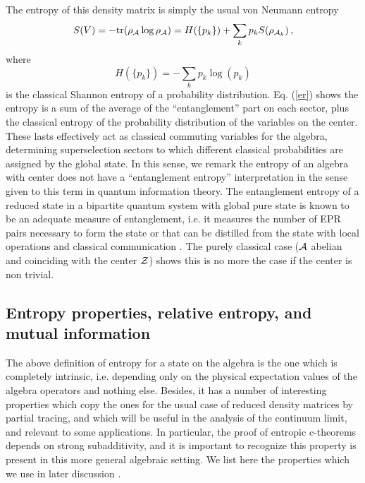 \documentclass[12pt,a4paper]{article}
\begin{document}
The entropy of this density matrix is simply the usual von Neumann entropy
\begin{equation}
S(V)=-\textrm{tr}(\rho_{\cal A}\log \rho_{\cal A})=H(\{p_k\})+\sum_k p_k S(\rho_{{\cal A}_k})\,,\label{er}
\end{equation}
where 
\begin{equation}
H(\{p_k\})=-\sum_k p_k \log(p_k)
\end{equation}
is the classical Shannon entropy of a probability distribution. 
Eq. (\ref{er}) shows the entropy is a sum of the average of the ``entanglement'' part on each sector, plus the classical entropy 
of the probability distribution of the variables on the center. These lasts effectively act as classical commuting variables for the 
algebra, determining superselection sectors to which different classical probabilities are assigned by the global state.  In this 
sense, we remark the entropy of an algebra with center does not have a ``entanglement entropy'' interpretation in the sense given 
to this term in quantum information theory. The entanglement entropy of a reduced state in a bipartite quantum system with global 
pure state is known to be an adequate measure of entanglement, i.e. it measures the number of EPR pairs necessary to form the state 
or that can be distilled from the state with local operations and classical communication \cite{nielsen}. The purely classical case (${\cal A}$ 
abelian and coinciding with the center ${\cal Z}$) shows this is no more the case if the center is non trivial.    

\subsection{Entropy properties, relative entropy, and mutual information}
The above definition of entropy for a state on the algebra is the one which is completely intrinsic, i.e. depending only on the physical 
expectation values of the algebra operators and nothing else. Besides, it has a number of interesting properties which copy the ones for the 
usual case of reduced density matrices by partial tracing, and which will be useful in the analysis of the continuum limit, and relevant to 
some applications. In particular,  the proof of entropic c-theorems depends on strong subadditivity, and it is important to recognize this property 
is present in this more general algebraic setting. We list here the properties which we use in later discussion \cite{petz}.  

\bigskip
\end{document}
